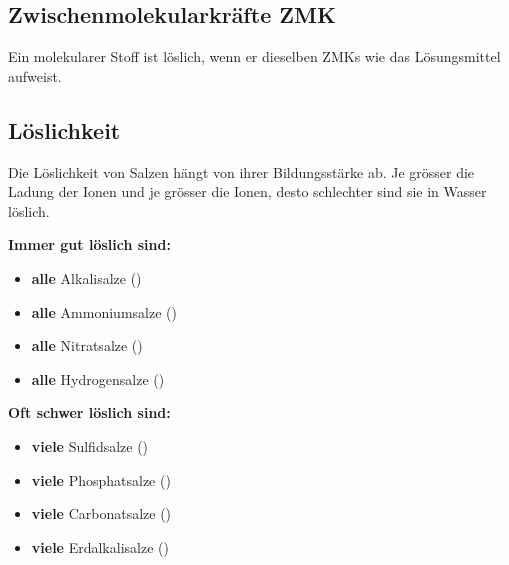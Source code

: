 \subsection{Zwischenmolekularkräfte ZMK}

    Ein molekularer Stoff ist löslich, wenn er dieselben ZMKs wie das Lösungsmittel aufweist.
\subsection{Löslichkeit}
    Die Löslichkeit von Salzen hängt von ihrer Bildungsstärke ab. 
    Je grösser die Ladung der Ionen und je grösser die Ionen, desto schlechter sind sie in Wasser löslich.
    
    \begin{minipage}{0.49\columnwidth}
        \textbf{Immer gut löslich sind:}
        \begin{itemize}
            \item \textbf{alle} Alkalisalze ()
            \item \textbf{alle} Ammoniumsalze ()
            \item \textbf{alle} Nitratsalze ()
            \item \textbf{alle} Hydrogensalze ()
        \end{itemize}
    \end{minipage}
    \hfill
    \begin{minipage}{0.49\columnwidth}
        \textbf{Oft schwer löslich sind:}
        \begin{itemize}
            \item \textbf{viele} Sulfidsalze ()
            \item \textbf{viele} Phosphatsalze ()
            \item \textbf{viele} Carbonatsalze ()
            \item \textbf{viele} Erdalkalisalze ()
        \end{itemize}
    \end{minipage}
